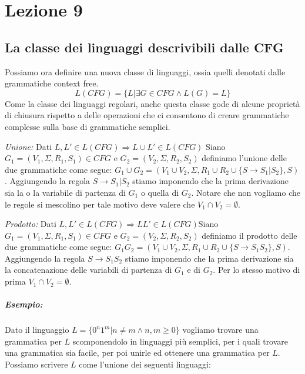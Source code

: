 
\section{Lezione 9}
\subsection{La classe dei linguaggi descrivibili dalle CFG}
Possiamo ora definire una nuova classe di linguaggi, ossia quelli denotati dalle grammatiche context free. 
\[
	L(CFG) = \{ L | \exists G \in CFG \land L(G) = L \}
\]
Come la classe dei linguaggi regolari, anche questa classe gode di alcune propriet\`a di chiusura rispetto a delle operazioni che ci consentono di creare grammatiche complesse sulla base di grammatiche semplici.
\begin{description}
	\item \emph{Unione:} Dati $L, L' \in L(CFG) \Rightarrow L \cup L' \in L(CFG)$ \newline Siano $G_1 = (V_1, \Sigma, R_1, S_1) \in CFG$ e $G_2= (V_2, \Sigma, R_2, S_2)$ definiamo l'unione delle due grammatiche come segue: $G_1 \cup G_2 = (V_1 \cup V_2, \Sigma, R_1 \cup R_2 \cup \{ S \to S_1 | S_2\}, S)$. Aggiungendo la regola $S \to S_1 | S_2$ stiamo imponendo che la prima derivazione sia la o la variabile di partenza di $G_1$ o quella di $G_2$. Notare che non vogliamo che le regole si mescolino per tale motivo deve valere che $V_1 \cap V_2 = \emptyset$.
	\item \emph{Prodotto:} Dati $L, L' \in L(CFG) \Rightarrow LL' \in L(CFG)$\newline Siano $G_1 = (V_1, \Sigma, R_1, S_1) \in CFG$ e $G_2= (V_2, \Sigma, R_2, S_2)$ definiamo il prodotto delle due grammatiche come segue: $G_1 G_2 = (V_1 \cup V_2, \Sigma, R_1 \cup R_2 \cup \{ S \to S_1S_2\}, S)$. Aggiungendo la regola $S \to S_1S_2$ stiamo imponendo che la prima derivazione sia la concatenazione delle variabili di partenza di $G_1$ e di $G_2$. Per lo stesso motivo di prima $V_1 \cap V_2 = \emptyset$. 
\end{description}
\subparagraph{Esempio:}  Dato il linguaggio $L = \{ 0^n1^m | n \neq m \land n, m \geq 0\}$ vogliamo trovare una grammatica per $L$ scomponendolo in linguaggi pi\`u semplici, per i quali trovare una grammatica sia facile, per poi unirle ed ottenere una grammatica per $L$. \newline Possiamo scrivere $L$ come l'unione dei seguenti linguaggi: 

